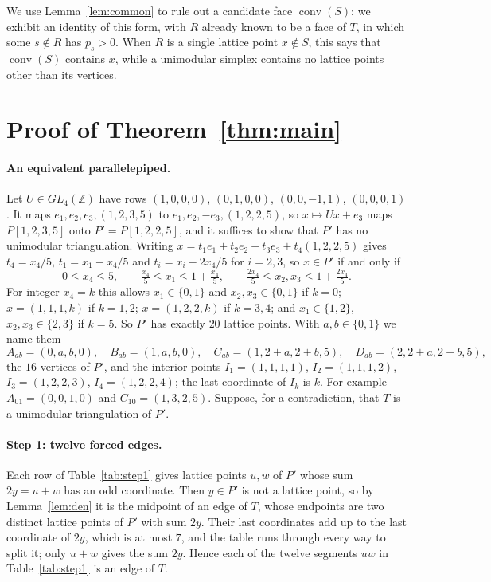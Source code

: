 \documentclass[11pt]{article}
\theoremstyle{definition}
\newcommand{\Z}{\mathbb{Z}}
\newcommand{\conv}{\operatorname{conv}}
\begin{document}
We use Lemma~\ref{lem:common} to rule out a candidate face $\conv(S)$: we
exhibit an identity of this form, with $R$ already known to be a face of $T$,
in which some $s\notin R$ has $p_s>0$. When $R$ is a single lattice point
$x\notin S$, this says that $\conv(S)$ contains $x$, while a unimodular
simplex contains no lattice points other than its vertices.

\section{Proof of Theorem~\ref{thm:main}}\label{sec:proof}

\paragraph{An equivalent parallelepiped.}
Let $U\in GL_4(\Z)$ have rows $(1,0,0,0)$, $(0,1,0,0)$, $(0,0,-1,1)$,
$(0,0,0,1)$. It maps $e_1,e_2,e_3,(1,2,3,5)$ to $e_1,e_2,-e_3,(1,2,2,5)$, so
$x\mapsto Ux+e_3$ maps $P[1,2,3,5]$ onto $P'=P[1,2,2,5]$, and it suffices to
show that $P'$ has no unimodular triangulation. Writing
$x=t_1e_1+t_2e_2+t_3e_3+t_4(1,2,2,5)$ gives $t_4=x_4/5$, $t_1=x_1-x_4/5$ and
$t_i=x_i-2x_4/5$ for $i=2,3$, so $x\in P'$ if and only if
\[
0\le x_4\le5,\qquad \tfrac{x_4}{5}\le x_1\le1+\tfrac{x_4}{5},\qquad
\tfrac{2x_4}{5}\le x_2,x_3\le 1+\tfrac{2x_4}{5}.
\]
For integer $x_4=k$ this allows $x_1\in\{0,1\}$ and $x_2,x_3\in\{0,1\}$ if
$k=0$; $x=(1,1,1,k)$ if $k=1,2$; $x=(1,2,2,k)$ if $k=3,4$; and
$x_1\in\{1,2\}$, $x_2,x_3\in\{2,3\}$ if $k=5$. So $P'$ has exactly $20$
lattice points. With $a,b\in\{0,1\}$ we name them
\[
A_{ab}=(0,a,b,0),\quad B_{ab}=(1,a,b,0),\quad C_{ab}=(1,2+a,2+b,5),\quad D_{ab}=(2,2+a,2+b,5),
\]
the $16$ vertices of $P'$, and the interior points $I_1=(1,1,1,1)$,
$I_2=(1,1,1,2)$, $I_3=(1,2,2,3)$, $I_4=(1,2,2,4)$; the last coordinate of
$I_k$ is $k$. For example $A_{01}=(0,0,1,0)$ and $C_{10}=(1,3,2,5)$.
Suppose, for a contradiction, that $T$ is a unimodular triangulation of
$P'$.

\paragraph{Step 1: twelve forced edges.}
Each row of Table~\ref{tab:step1} gives lattice points $u,w$ of $P'$ whose
sum $2y=u+w$ has an odd coordinate. Then $y\in P'$ is not a lattice point,
so by Lemma~\ref{lem:den} it is the midpoint of an edge of $T$, whose
endpoints are two distinct lattice points of $P'$ with sum $2y$. Their last
coordinates add up to the last coordinate of $2y$, which is at most $7$,
and the table runs through every way to split it; only $u+w$ gives the sum
$2y$. Hence each of the twelve segments $uw$ in Table~\ref{tab:step1} is an
edge of $T$.
\end{document}

